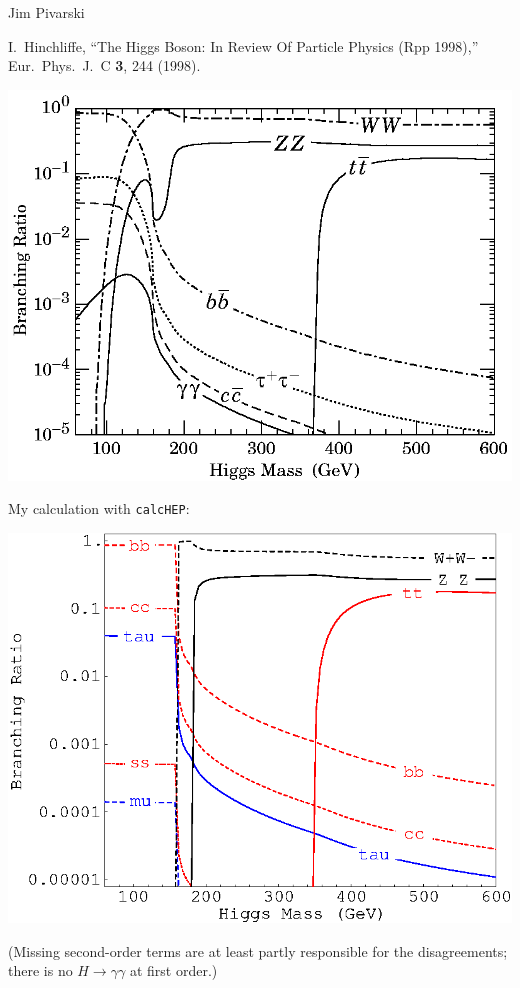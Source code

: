 \documentclass{article}
\begin{document}
\Large

\noindent \hspace{-2 cm} Jim Pivarski

\vspace{0.5 cm}
\noindent I.~Hinchliffe,
``The Higgs Boson: In Review Of Particle Physics (Rpp 1998),''
Eur.\ Phys.\ J.\ C {\bf 3}, 244 (1998).
\begin{center}
  \vspace{-1 cm}
  \hspace{0.5 cm}
  \includegraphics[width=0.95\linewidth]{../../a-exam/ritchie/higgs_branching_ratios.eps}
\end{center}

\noindent My calculation with {\tt calcHEP}:
\begin{center}
  \includegraphics[width=\linewidth]{higgs.eps}
\end{center}
\begin{minipage}{\linewidth}
  \large (Missing second-order terms are at least partly
  responsible for the disagreements; there is no $H \to \gamma \gamma$
  at first order.)
\end{minipage}
\end{document}
